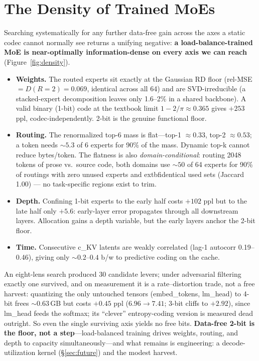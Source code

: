 \documentclass[10pt]{article}
\begin{document}
\section{The Density of Trained MoEs}\label{sec:density}
Searching systematically for any further data-free gain across the axes a static codec cannot normally see
returns a unifying negative: \textbf{a load-balance-trained MoE is near-optimally information-dense on every
axis we can reach} (Figure~\ref{fig:density}).
\begin{itemize}\itemsep1pt
\item \textbf{Weights.} The routed experts sit exactly at the Gaussian RD floor (rel-MSE $=D(R{=}2)=0.069$,
identical across all 64) and are SVD-irreducible (a stacked-expert decomposition leaves only 1.6--2\% in a
shared backbone). A valid binary (1-bit) code at the textbook limit $1-2/\pi\approx0.365$ gives $+253$ ppl,
codec-independently. 2-bit is the genuine functional floor.
\item \textbf{Routing.} The renormalized top-6 mass is flat---top-1 ${\approx}0.33$, top-2 ${\approx}0.53$;
a token needs ${\sim}5.3$ of 6 experts for 90\% of the mass. Dynamic top-k cannot reduce bytes/token. The flatness is also \emph{domain-conditional}: routing 2048 tokens of prose vs.\ source code, both domains use ${\sim}50$ of 64 experts for 90\% of routings with zero unused experts and 	extbf{identical} used sets (Jaccard 1.00) --- no task-specific regions exist to trim.
\item \textbf{Depth.} Confining 1-bit experts to the early half costs $+102$ ppl but to the late half only
$+5.6$: early-layer error propagates through all downstream layers. Allocation gains a depth variable, but
the early layers anchor the 2-bit floor.
\item \textbf{Time.} Consecutive c\_KV latents are weakly correlated (lag-1 autocorr 0.19--0.46), giving
only ${\sim}0.2$--$0.4$ b/w to predictive coding on the cache.
\end{itemize}
An eight-lens search produced 30 candidate levers; under adversarial filtering exactly one survived, and on
measurement it is a rate--distortion trade, not a free harvest: quantizing the only untouched tensors
(embed\_tokens, lm\_head) to 4-bit frees ${\sim}0.63$\,GB but costs $+0.45$ ppl ($6.96\to7.41$; 3-bit
cliffs to $+2.92$), since lm\_head feeds the softmax; its ``clever'' entropy-coding version is measured dead
outright. So even the single surviving axis yields no free bits. \textbf{Data-free 2-bit is the floor, not
a step}---load-balanced training drives weights, routing, and depth to capacity simultaneously---and what
remains is engineering: a decode-utilization kernel (\S\ref{sec:future}) and the modest harvest.
\end{document}
